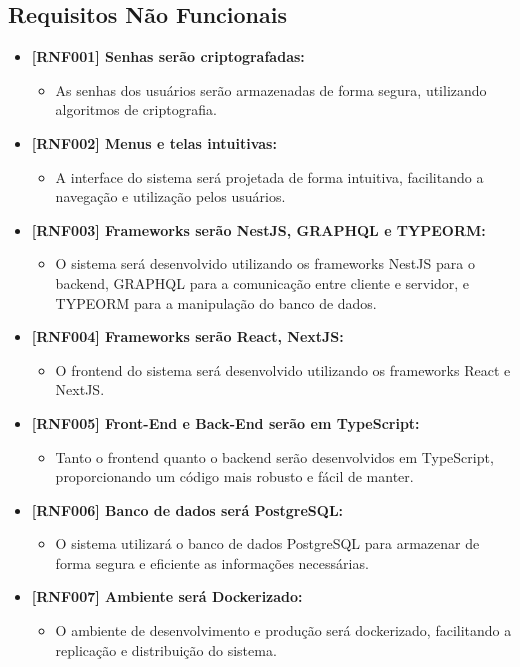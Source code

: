 \documentclass[12pt]{article}
\begin{document}
\subsection{Requisitos Não Funcionais}

\begin{itemize}

   \item \textbf{[RNF001] Senhas serão criptografadas:}
    \begin{itemize}
        \item As senhas dos usuários serão armazenadas de forma segura, utilizando algoritmos de criptografia.
    \end{itemize}
    \item \textbf{[RNF002] Menus e telas intuitivas:}
    \begin{itemize}
        \item A interface do sistema será projetada de forma intuitiva, facilitando a navegação e utilização pelos usuários.
    \end{itemize}
    \item \textbf{[RNF003] Frameworks serão NestJS, GRAPHQL e TYPEORM:}
    \begin{itemize}
        \item O sistema será desenvolvido utilizando os frameworks NestJS para o backend, GRAPHQL para a comunicação entre cliente e servidor, e TYPEORM para a manipulação do banco de dados.
    \end{itemize}
    \item \textbf{[RNF004] Frameworks serão React, NextJS:}
    \begin{itemize}
        \item O frontend do sistema será desenvolvido utilizando os frameworks React e NextJS.
    \end{itemize}
    \item \textbf{[RNF005] Front-End e Back-End serão em TypeScript:}
    \begin{itemize}
        \item Tanto o frontend quanto o backend serão desenvolvidos em TypeScript, proporcionando um código mais robusto e fácil de manter.
    \end{itemize}
    \item \textbf{[RNF006] Banco de dados será PostgreSQL:}
    \begin{itemize}
        \item O sistema utilizará o banco de dados PostgreSQL para armazenar de forma segura e eficiente as informações necessárias.
    \end{itemize}
    \item \textbf{[RNF007] Ambiente será Dockerizado:}
    \begin{itemize}
        \item O ambiente de desenvolvimento e produção será dockerizado, facilitando a replicação e distribuição do sistema.
    \end{itemize}
\end{itemize}
\end{document}
